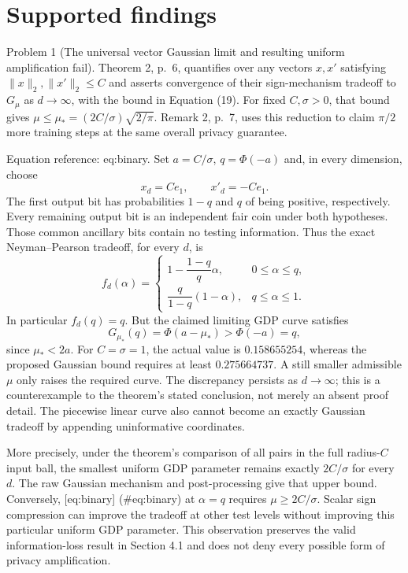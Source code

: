 \documentclass[10pt]{article}
\begin{document}
\section*{Supported findings}
Problem 1 (The universal vector Gaussian limit and resulting uniform amplification fail).  Theorem 2, p. 6, quantifies over any vectors \(x,x'\) satisfying \(\|x\|_2,\|x'\|_2\le C\) and asserts convergence of their sign-mechanism tradeoff to \(G_\mu\) as \(d\to\infty\), with the bound in Equation (19). For fixed \(C,\sigma>0\), that bound gives \(\mu\le\mu_*=(2C/\sigma)\sqrt{2/\pi}\). Remark 2, p. 7, uses this reduction to claim \(\pi/2\) more training steps at the same overall privacy guarantee.\par
Equation reference: eq:binary. Set \(a=C/\sigma\), \(q=\Phi(-a)\) and, in every dimension, choose \[x_d=Ce_1,\qquad x'_d=-Ce_1.\] The first output bit has probabilities \(1-q\) and \(q\) of being positive, respectively. Every remaining output bit is an independent fair coin under both hypotheses. Those common ancillary bits contain no testing information. Thus the exact Neyman–Pearson tradeoff, for every \(d\), is \[
f_d(\alpha)=
\begin{cases}
1-\dfrac{1-q}{q}\alpha,&0\le\alpha\le q,\\[3pt]
\dfrac{q}{1-q}(1-\alpha),&q\le\alpha\le1.
\end{cases}\] In particular \(f_d(q)=q\). But the claimed limiting GDP curve satisfies \[G_{\mu_*}(q)=\Phi(a-\mu_*)>\Phi(-a)=q,\] since \(\mu_*<2a\). For \(C=\sigma=1\), the actual value is \(0.158655254\), whereas the proposed Gaussian bound requires at least \(0.275664737\). A still smaller admissible \(\mu\) only raises the required curve. The discrepancy persists as \(d\to\infty\); this is a counterexample to the theorem’s stated conclusion, not merely an absent proof detail. The piecewise linear curve also cannot become an exactly Gaussian tradeoff by appending uninformative coordinates.\par
More precisely, under the theorem’s comparison of all pairs in the full radius-\(C\) input ball, the smallest uniform GDP parameter remains exactly \(2C/\sigma\) for every \(d\). The raw Gaussian mechanism and post-processing give that upper bound. Conversely, [eq:binary] (\#eq:binary) at \(\alpha=q\) requires \(\mu\ge2C/\sigma\). Scalar sign compression can improve the tradeoff at other test levels without improving this particular uniform GDP parameter. This observation preserves the valid information-loss result in Section 4.1 and does not deny every possible form of privacy amplification.\par
\end{document}
